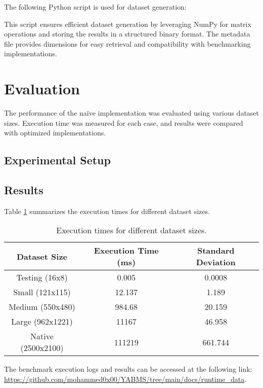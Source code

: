 \documentclass[12pt]{article}
\begin{document}
The following Python script is used for dataset generation:


This script ensures efficient dataset generation by leveraging NumPy for matrix operations and storing the results in a structured binary format. The metadata file provides dimensions for easy retrieval and compatibility with benchmarking implementations.

\section{Evaluation}
The performance of the naïve implementation was evaluated using various dataset sizes. Execution time was measured for each case, and results were compared with optimized implementations.

\subsection{Experimental Setup}


\subsection{Results}
Table \ref{tab:results} summarizes the execution times for different dataset sizes.
\begin{table}[h]
    \begin{center}
        \begin{tabular}{|c|c|c|}
            \hline
            \textbf{Dataset Size} & \textbf{Execution Time (ms)} & \textbf{Standard Deviation} \\
            \hline
            Testing (16x8) & 0.005 & 0.0008 \\
            Small (121x115) & 12.137 & 1.189 \\
            Medium (550x480) & 984.68 & 20.159 \\
            Large (962x1221) & 11167 & 46.958 \\
            Native (2500x2100) & 111219 & 661.744 \\
            \hline
        \end{tabular}
        \caption{Execution times for different dataset sizes.}
        \label{tab:results}
    \end{center}
\end{table}

    The benchmark execution logs and results can be accessed at the following link: \url{https://github.com/mohammed0x00/YABMS/tree/main/docs/runtime_data}.
\end{document}
